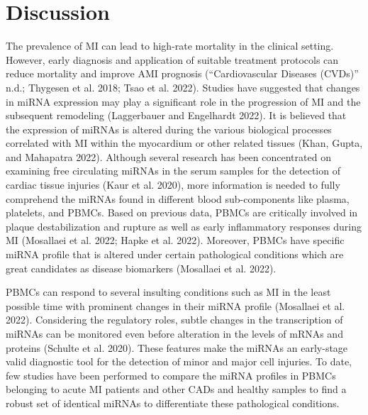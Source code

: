 \documentclass[smallextended]{svjour3}       %
\begin{document}
\hypertarget{discussion}{%
\section{Discussion}\label{discussion}}

The prevalence of MI can lead to high-rate mortality in the clinical
setting. However, early diagnosis and application of suitable treatment
protocols can reduce mortality and improve AMI prognosis
({``Cardiovascular Diseases ({CVDs})''} n.d.; Thygesen et al. 2018; Tsao
et al. 2022). Studies have suggested that changes in miRNA expression
may play a significant role in the progression of MI and the subsequent
remodeling (Laggerbauer and Engelhardt 2022). It is believed that the
expression of miRNAs is altered during the various biological processes
correlated with MI within the myocardium or other related tissues (Khan,
Gupta, and Mahapatra 2022). Although several research has been
concentrated on examining free circulating miRNAs in the serum samples
for the detection of cardiac tissue injuries (Kaur et al. 2020), more
information is needed to fully comprehend the miRNAs found in different
blood sub-components like plasma, platelets, and PBMCs. Based on
previous data, PBMCs are critically involved in plaque destabilization
and rupture as well as early inflammatory responses during MI (Mosallaei
et al. 2022; Hapke et al. 2022). Moreover, PBMCs have specific miRNA
profile that is altered under certain pathological conditions which are
great candidates as disease biomarkers (Mosallaei et al. 2022).

PBMCs can respond to several insulting conditions such as MI in the
least possible time with prominent changes in their miRNA profile
(Mosallaei et al. 2022). Considering the regulatory roles, subtle
changes in the transcription of miRNAs can be monitored even before
alteration in the levels of mRNAs and proteins (Schulte et al. 2020).
These features make the miRNAs an early-stage valid diagnostic tool for
the detection of minor and major cell injuries. To date, few studies
have been performed to compare the miRNA profiles in PBMCs belonging to
acute MI patients and other CADs and healthy samples to find a robust
set of identical miRNAs to differentiate these pathological conditions.
\end{document}
